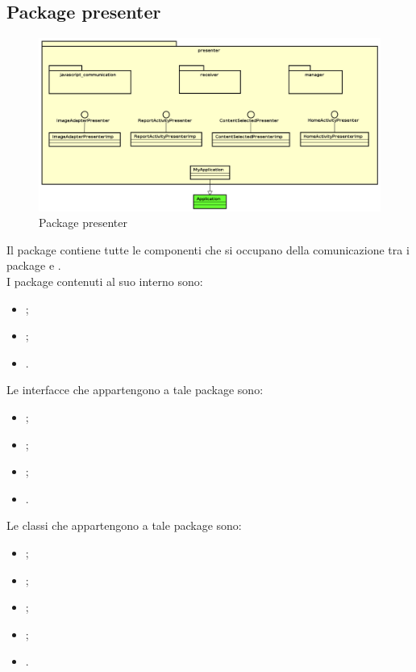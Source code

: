 \documentclass[../Tesi.tex]{subfiles}
\begin{document}
	\subsection{Package presenter}
		\begin{figure}[H]
			\centering
			\includegraphics[scale=0.4]{images/package_diagrams/presenter}
				\caption{Package presenter}
		\end{figure}
		Il package  contiene tutte le componenti che si occupano della comunicazione tra i package  e . \\
		I package contenuti al suo interno sono:
		\begin{itemize}
			\item {};
			\item {};
			\item {}.
		\end{itemize}
		Le interfacce che appartengono a tale package sono:
		\begin{itemize}
			\item {};
			\item {};
			\item {};
			\item {}.
		\end{itemize}
		Le classi che appartengono a tale package sono:
		\begin{itemize}
			\item {};
			\item {};
			\item {};
			\item {};
			\item {}.
		\end{itemize}
\end{document}
